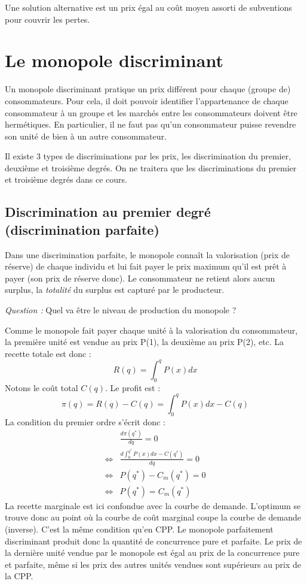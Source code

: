 \documentclass[
  a4paper,
]{book}
\theoremstyle{definition}
\theoremstyle{definition}
\theoremstyle{definition}
\theoremstyle{definition}
\theoremstyle{remark}
\begin{document}
Une solution alternative est un prix égal au coût moyen assorti de subventions pour couvrir les pertes.

\hypertarget{le-monopole-discriminant}{%
\section{Le monopole discriminant}\label{le-monopole-discriminant}}

Un monopole discriminant pratique un prix différent pour chaque (groupe de) consommateurs.
Pour cela, il doit pouvoir identifier l'appartenance de chaque consommateur à un groupe et les marchés entre les consommateurs doivent être hermétiques.
En particulier, il ne faut pas qu'un consommateur puisse revendre son unité de bien à un autre consommateur.

Il existe 3 types de discriminations par les prix, les discrimination du premier, deuxième et troisième degrés.
On ne traitera que les discriminations du premier et troisième degrés dans ce cours.

\hypertarget{discrimination-au-premier-degruxe9-discrimination-parfaite}{%
\subsection{Discrimination au premier degré (discrimination parfaite)}\label{discrimination-au-premier-degruxe9-discrimination-parfaite}}

Dans une discrimination parfaite, le monopole connaît la valorisation (prix de réserve) de chaque individu et lui fait payer le prix maximum qu'il est prêt à payer (son prix de réserve donc).
Le consommateur ne retient alors aucun surplus, la \emph{totalité} du surplus est capturé par le producteur.

\emph{Question :} Quel va être le niveau de production du monopole ?

Comme le monopole fait payer chaque unité à la valorisation du consommateur, la première unité est vendue au prix P(1), la deuxième au prix P(2), etc.
La recette totale est donc :
\[
R(q) = \int_0^q P(x) dx
\]
Notons le coût total \(C(q)\).
Le profit est :
\[
\pi(q) = R(q) - C(q) = \int_0^q P(x) dx -C(q)
\]
La condition du premier ordre s'écrit donc :
\[
\begin{array}{rl}
&\frac{d\pi(q^*)}{dq} = 0\\
\Leftrightarrow & \frac{d\int_0^{q^*} P(x) dx -C(q^*)}{dq} = 0\\
\Leftrightarrow & P(q^*) - C_m(q^*) = 0\\
\Leftrightarrow & P(q^*) = C_m(q^*)
\end{array}
\]
La recette marginale est ici confondue avec la courbe de demande.
L'optimum se trouve donc au point où la courbe de coût marginal coupe la courbe de demande (inverse).
C'est la même condition qu'en CPP.
Le monopole parfaitement discriminant produit donc la quantité de concurrence pure et parfaite.
Le prix de la dernière unité vendue par le monopole est égal au prix de la concurrence pure et parfaite, même si les prix des autres unités vendues sont supérieurs au prix de la CPP.
\end{document}
